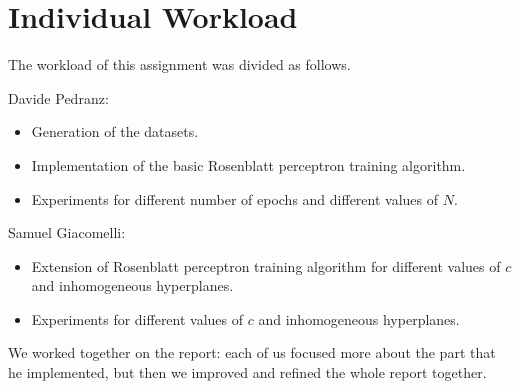 \section{Individual Workload}
The workload of this assignment was divided as follows.

Davide Pedranz:
\begin{itemize}
    \item Generation of the datasets.
    \item Implementation of the basic Rosenblatt perceptron training algorithm.
    \item Experiments for different number of epochs and different values of $N$.
\end{itemize}

Samuel Giacomelli:
\begin{itemize}
    \item Extension of Rosenblatt perceptron training algorithm for different values of $c$ and inhomogeneous hyperplanes.
    \item Experiments for different values of $c$ and inhomogeneous hyperplanes.
\end{itemize}

We worked together on the report:
each of us focused more about the part that he implemented, but then we improved and refined the whole report together.
